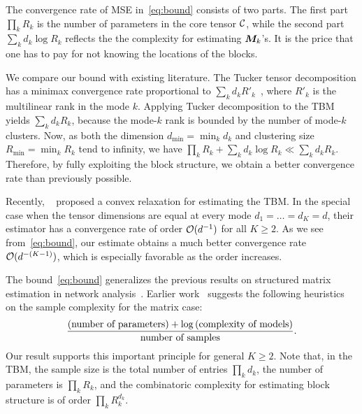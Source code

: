 \documentclass{article}
\begin{document}
The convergence rate of MSE in~\eqref{eq:bound} consists of two parts. The first part $\prod_k R_k$ is the number of parameters in the core tensor $\mathcal{C}$, while the second part $\sum_k d_k \log R_k$ reflects the the complexity for estimating $\bm M_k$'s. It is the price that one has to pay for not knowing the locations of the blocks.  

We compare our bound with existing literature. The Tucker tensor decomposition has a minimax convergence rate proportional to $\sum_kd_kR'_k$~\cite{zhang2018tensor}, where $R'_k$ is the multilinear rank in the mode $k$. Applying Tucker decomposition to the TBM yields $\sum_kd_kR_k$, because the mode-$k$ rank is bounded by the number of mode-$k$ clusters. Now, as both the dimension $d_{\min}=\min_kd_k$ and clustering size $R_{\min}=\min_k R_k$ tend to infinity, we have $\prod_k R_k+ \sum_k d_k \log R_k\ll \sum_k d_k R_k$. Therefore, by fully exploiting the block structure, we obtain a better convergence rate than previously possible. 

Recently, ~\cite{chi2018provable} proposed a convex relaxation for estimating the TBM. In the special case when the tensor dimensions are equal at every mode $d_1=\ldots=d_K=d$, their estimator has a convergence rate of order $\mathcal{O}(d^{-1})$ for all $K\geq 2$. As we see from~\eqref{eq:bound}, our estimate obtains a much better convergence rate $\mathcal{O}(d^{-(K-1)})$, which is especially favorable as the order increases. 


The bound~\eqref{eq:bound} generalizes the previous results on structured matrix estimation in network analysis~\cite{gao2016optimal,gao2018minimax}. %
Earlier work~\cite{gao2018minimax} suggests the following heuristics on the sample complexity for the matrix case:
\begin{equation} \label{eq:intuition}
{\text{(number of parameters)}+ \log \text{(complexity of models)}\over \text{number of samples}}.
\end{equation}
Our result supports this important principle for general $K\geq 2$. Note that, in the TBM, the sample size is the total number of entries $\prod_k d_k$, the number of parameters is $\prod_k R_k$, and the combinatoric complexity for estimating block structure is of order $\prod_k R_k^{d_k}$. 
\end{document}
